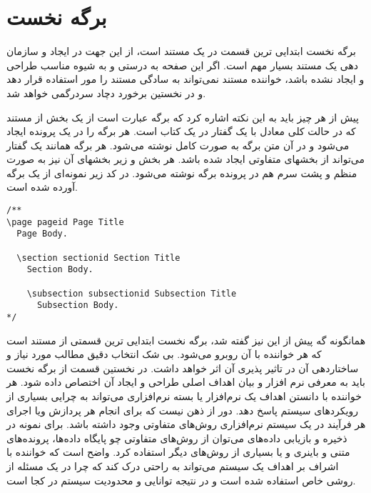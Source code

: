 
\section{برگه نخست}
  برگه نخست ابتدایی ترین قسمت در یک مستند است، از این جهت در ایجاد و سازمان دهی
  یک مستند بسیار مهم است.
  اگر این صفحه به درستی و به شیوه مناسب طراحی و ایجاد نشده باشد، خواننده مستند
  نمی‌تواند به سادگی مستند را مور استفاده قرار دهد و در نخستین برخورد دچاد
  سردرگمی خواهد شد.

  پیش از هر چیز باید به این نکته اشاره کرد که برگه عبارت است از یک بخش از مستند
  که در حالت کلی معادل با یک گفتار در یک کتاب است.
  هر برگه را در یک پرونده  ایجاد می‌شود و در آن متن برگه به صورت کامل
  نوشته می‌شود.
  هر برگه همانند یک گفتار می‌تواند از بخشهای متفاوتی ایجاد شده باشد.
  هر بخش و زیر بخشهای آن نیز به صورت منظم و پشت سرم هم در پرونده برگه نوشته
  می‌شود. در کد زیر نمونه‌ای از یک برگه آورده شده است.
  
\begin{latin}
\lstset{language=C++}
\begin{lstlisting}[frame=single] 
/**
\page pageid Page Title
  Page Body.
  
  \section sectionid Section Title
    Section Body.

    \subsection subsectionid Subsection Title
      Subsection Body.
*/
\end{lstlisting}
\end{latin}

  همانگونه گه پیش از این نیز گفته شد، برگه نخست ابتدایی ترین قسمتی از مستند است
  که هر خواننده با آن روبرو می‌شود. بی شک انتخاب دقیق مطالب مورد نیاز و
  ساختاردهی آن در تاثیر پذیری آن اثر خواهد داشت.
  در نخستین قسمت از برگه نخست باید به معرفی نرم افزار و بیان اهداف اصلی طراحی و
  ایجاد آن اختصاص داده شود.
  هر خواننده با دانستن اهداف یک نرم‌افزار یا بسته نرم‌افزاری می‌تواند به چرایی
  بسیاری از رویکردهای سیستم پاسخ دهد.
  دور از ذهن نیست که برای انجام هر پردازش ویا اجرای هر فرآیند در یک سیستم
  نرم‌افزاری روش‌های متفاوتی وجود داشته باشد. برای نمونه در ذخیره و بازیابی
  داده‌های می‌توان از روش‌های متفاوتی چو پایگاه داده‌ها، پرونده‌های متنی و
  باینری و یا بسیاری از روش‌های دیگر استفاده کرد. واضح است که خواننده با اشراف
  بر اهداف یک سیستم می‌تواند به راحتی درک کند که چرا در یک مسئله از روشی خاص
  استفاده شده است و در نتیجه توانایی و محدودیت سیستم در کجا است.

